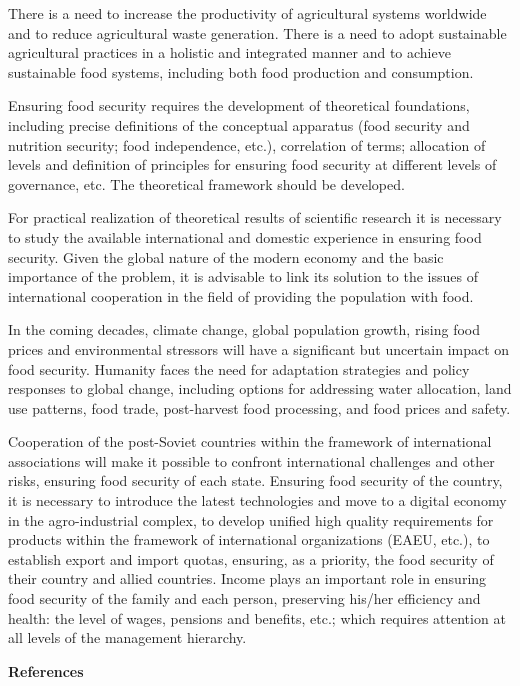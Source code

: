 {There is a need to increase the productivity of agricultural systems
worldwide and to reduce agricultural waste generation. There is a need
to adopt sustainable agricultural practices in a holistic and integrated
manner and to achieve sustainable food systems, including both food
production and consumption.

Ensuring food security requires the development of theoretical
foundations, including precise definitions of the conceptual apparatus
(food security and nutrition security; food independence, etc.),
correlation of terms; allocation of levels and definition of principles
for ensuring food security at different levels of governance, etc. The
theoretical framework should be developed.

For practical realization of theoretical results of scientific research
it is necessary to study the available international and domestic
experience in ensuring food security. Given the global nature of the
modern economy and the basic importance of the problem, it is advisable
to link its solution to the issues of international cooperation in the
field of providing the population with food.

In the coming decades, climate change, global population growth, rising
food prices and environmental stressors will have a significant but
uncertain impact on food security. Humanity faces the need for
adaptation strategies and policy responses to global change, including
options for addressing water allocation, land use patterns, food trade,
post-harvest food processing, and food prices and safety.

Cooperation of the post-Soviet countries within the framework of
international associations will make it possible to confront
international challenges and other risks, ensuring food security of each
state. Ensuring food security of the country, it is necessary to
introduce the latest technologies and move to a digital economy in the
agro-industrial complex, to develop unified high quality requirements
for products within the framework of international organizations (EAEU,
etc.), to establish export and import quotas, ensuring, as a priority,
the food security of their country and allied countries. Income plays an
important role in ensuring food security of the family and each person,
preserving his/her efficiency and health: the level of wages, pensions
and benefits, etc.; which requires attention at all levels of the
management hierarchy.

{\bfseries References}

}
